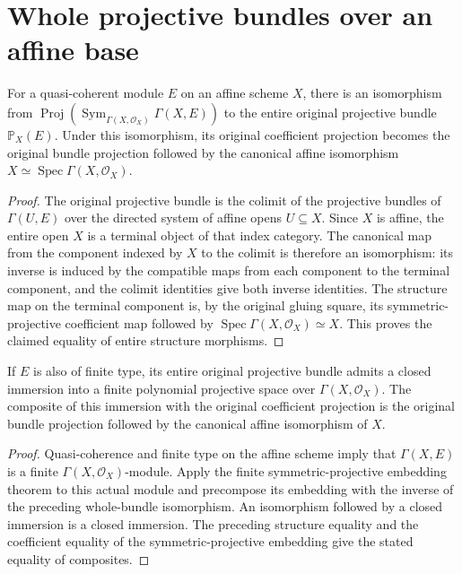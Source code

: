 \section{Whole projective bundles over an affine base}

\begin{lemma}
\label{lem:fc-whole-affine-projective-bundle}
\leanok
{}
For a quasi-coherent module $E$ on an affine scheme $X$, there is an
isomorphism from $\operatorname{Proj}(\operatorname{Sym}_{\Gamma(X,\mathcal O_X)}
\Gamma(X,E))$ to the entire original projective bundle $\mathbb P_X(E)$.
Under this isomorphism, its original coefficient projection becomes
the original bundle projection followed by the canonical affine
isomorphism $X\simeq\operatorname{Spec}\Gamma(X,\mathcal O_X)$.
\end{lemma}
\begin{proof}
The original projective bundle is the colimit of the projective
bundles of $\Gamma(U,E)$ over the directed system of affine opens
$U\subseteq X$.  Since $X$ is affine, the entire open $X$ is a terminal
object of that index category.  The canonical map from the component
indexed by $X$ to the colimit is therefore an isomorphism: its inverse
is induced by the compatible maps from each component to the terminal
component, and the colimit identities give both inverse identities.
The structure map on the terminal component is, by the original
gluing square, its symmetric-projective coefficient map followed by
$\operatorname{Spec}\Gamma(X,\mathcal O_X)\simeq X$.  This proves the
claimed equality of entire structure morphisms.
\end{proof}

\begin{theorem}
\label{thm:fc-whole-affine-bundle-polynomial-embedding}
\leanok
{}
If $E$ is also of finite type, its entire original projective bundle
admits a closed immersion into a finite polynomial projective space
over $\Gamma(X,\mathcal O_X)$.  The composite of this immersion with
the original coefficient projection is the original bundle
projection followed by the canonical affine isomorphism of $X$.
\end{theorem}
\begin{proof}
Quasi-coherence and finite type on the affine scheme imply that
$\Gamma(X,E)$ is a finite $\Gamma(X,\mathcal O_X)$-module.  Apply the
finite symmetric-projective embedding theorem to this actual module
and precompose its embedding with the inverse of the preceding
whole-bundle isomorphism.  An isomorphism followed by a closed
immersion is a closed immersion.  The preceding structure equality
and the coefficient equality of the symmetric-projective embedding
give the stated equality of composites.
\end{proof}

